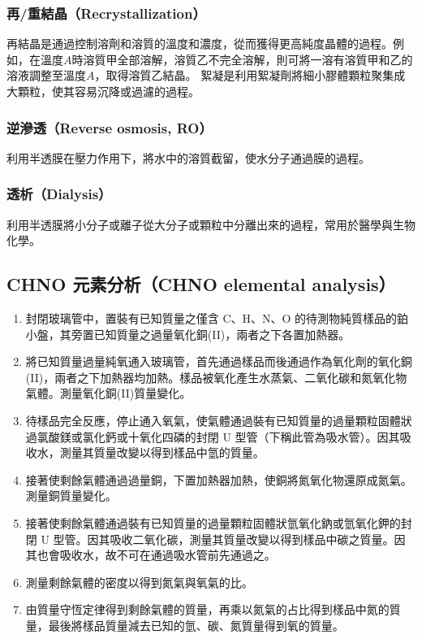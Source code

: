 \documentclass[a4paper,12pt]{article}
\begin{document}
\subsubsection{再/重結晶（Recrystallization）}
再結晶是通過控制溶劑和溶質的溫度和濃度，從而獲得更高純度晶體的過程。例如，在溫度\(A\)時溶質甲全部溶解，溶質乙不完全溶解，則可將一溶有溶質甲和乙的溶液調整至溫度\(A\)，取得溶質乙結晶。
絮凝是利用絮凝劑將細小膠體顆粒聚集成大顆粒，使其容易沉降或過濾的過程。
\subsubsection{逆滲透（Reverse osmosis, RO）}
利用半透膜在壓力作用下，將水中的溶質截留，使水分子通過膜的過程。
\subsubsection{透析（Dialysis）}
利用半透膜將小分子或離子從大分子或顆粒中分離出來的過程，常用於醫學與生物化學。
\subsection{CHNO 元素分析（CHNO elemental analysis）}
\begin{enumerate}
\item 封閉玻璃管中，置裝有已知質量之僅含 C、H、N、O 的待測物純質樣品的鉑小盤，其旁置已知質量之過量氧化銅(II)，兩者之下各置加熱器。
\item 將已知質量過量純氧通入玻璃管，首先通過樣品而後通過作為氧化劑的氧化銅(II)，兩者之下加熱器均加熱。樣品被氧化產生水蒸氣、二氧化碳和氮氧化物氣體。測量氧化銅(II)質量變化。
\item 待樣品完全反應，停止通入氧氣，使氣體通過裝有已知質量的過量顆粒固體狀過氯酸鎂或氯化鈣或十氧化四磷的封閉 U 型管（下稱此管為吸水管）。因其吸收水，測量其質量改變以得到樣品中氫的質量。
\item 接著使剩餘氣體通過過量銅，下置加熱器加熱，使銅將氮氧化物還原成氮氣。測量銅質量變化。
\item 接著使剩餘氣體通過裝有已知質量的過量顆粒固體狀氫氧化鈉或氫氧化鉀的封閉 U 型管。因其吸收二氧化碳，測量其質量改變以得到樣品中碳之質量。因其也會吸收水，故不可在通過吸水管前先通過之。
\item 測量剩餘氣體的密度以得到氮氣與氧氣的比。
\item 由質量守恆定律得到剩餘氣體的質量，再乘以氮氣的占比得到樣品中氮的質量，最後將樣品質量減去已知的氫、碳、氮質量得到氧的質量。
\end{enumerate}
\end{document}
